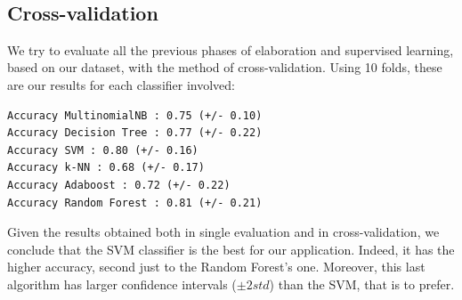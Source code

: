 \documentclass[a4paper]{article}
\begin{document}
\begin{figure}[b]
 \\
\caption{}
\label{fig:confusion_matrices}
\end{figure}

\subsection{Cross-validation}
We try to evaluate all the previous phases of elaboration and supervised learning, based on our dataset, with the method of cross-validation. Using 10 folds, these are our results for each classifier involved:
\begin{verbatim}
Accuracy MultinomialNB : 0.75 (+/- 0.10)
Accuracy Decision Tree : 0.77 (+/- 0.22)
Accuracy SVM : 0.80 (+/- 0.16)
Accuracy k-NN : 0.68 (+/- 0.17)
Accuracy Adaboost : 0.72 (+/- 0.22)
Accuracy Random Forest : 0.81 (+/- 0.21)
\end{verbatim}

Given the results obtained both in single evaluation and in cross-validation, we conclude that the SVM classifier is the best for our application. Indeed, it has the higher accuracy, second just to the Random Forest's one. Moreover, this last algorithm has larger confidence intervals ($\pm 2std$) than the SVM, that is to prefer. 
\end{document}
